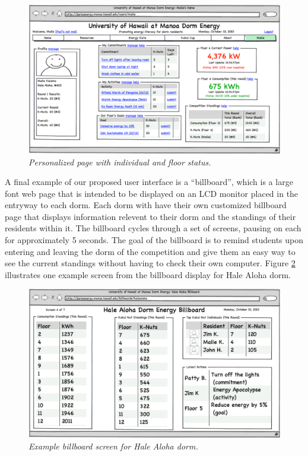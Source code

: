 \documentclass[11pt]{article}
\begin{document}
\begin{figure}[!ht]
  \center
  \includegraphics[width=1.0\textwidth]{maile.png.eps}
  \caption{\em \small Personalized page with individual and floor status.}
 \label{fig:mailepage}
\end{figure} 

A final example of our proposed user interface is a ``billboard'', which is
a large font web page that is intended to be displayed on an LCD monitor
placed in the entryway to each dorm. Each dorm with have their own
customized billboard page that displays information relevent to their dorm
and the standings of their residents within it. The billboard cycles
through a set of screens, pausing on each for approximately 5 seconds.  The
goal of the billboard is to remind students upon entering and leaving the
dorm of the competition and give them an easy way to see the current
standings without having to check their own computer.  Figure
\ref{fig:billboardpage} illustrates one example screen from the billboard
display for Hale Aloha dorm.

\begin{figure}[!ht]
  \center
  \includegraphics[width=1.0\textwidth]{billboard.png.eps}
  \caption{\em \small Example billboard screen for Hale Aloha dorm.}
 \label{fig:billboardpage}
\end{figure} 
\end{document}
